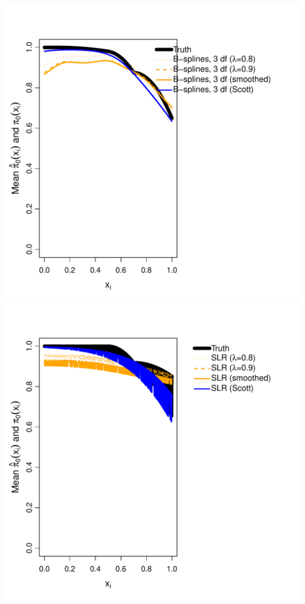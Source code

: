 \documentclass{article}\usepackage[]{graphicx}\usepackage[]{color}
\makeatletter
\def\maxwidth{ %
  \ifdim\Gin@nat@width>\linewidth
    \linewidth
  \else
    \Gin@nat@width
  \fi
}
\newenvironment{knitrout}{}{} %
\makeatother
\begin{document}
\begin{knitrout}
{\includegraphics[width=\maxwidth]{Figures/unnamed-chunk-1-3} 
\includegraphics[width=\maxwidth]{Figures/unnamed-chunk-1-4} 
}
\end{knitrout}
\end{document}
